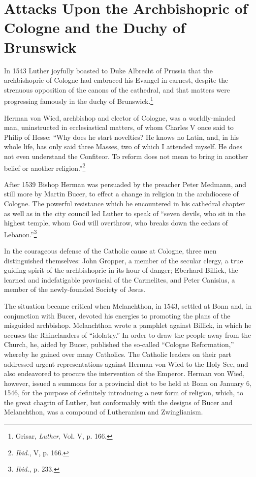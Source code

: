 \section{Attacks Upon the Archbishopric of Cologne and the Duchy of Brunswick}

In 1543 Luther joyfully boasted to Duke Albrecht of Prussia that
the archbishopric of Cologne had embraced his Evangel in earnest,
despite the strenuous opposition of the canons of the cathedral, and
that matters were progressing famously in the duchy of Brunswick.\footnote{Grisar, \textit{Luther}, Vol. V, p. 166.}

Herman von Wied, archbishop and elector of Cologne, was a
worldly-minded man, uninstructed in ecclesiastical matters, of whom
Charles V once said to Philip of Hesse: “Why does he start novelties?
He knows no Latin, and, in his whole life, has only said three Masses,
two of which I attended myself. He does not even understand the
Confiteor. To reform does not mean to bring in another belief or
another religion.”\footnote{\textit{Ibid.}, V, p. 166.}

After 1539 Bishop Herman was persuaded by the preacher Peter
Medmann, and still more by Martin Bucer, to effect a change in religion
in the archdiocese of Cologne. The powerful resistance which
he encountered in his cathedral chapter as well as in the city council
led Luther to speak of “seven devils, who sit in the highest temple,
whom God will overthrow, who breaks down the cedars of Lebanon.”\footnote{\textit{Ibid.}, p. 233.}

In the courageous defense of the Catholic cause at Cologne,
three men distinguished themselves: John Gropper, a member of the
secular clergy, a true guiding spirit of the archbishopric in its hour
of danger; Eberhard Billick, the lcarned and indefatigable provincial
of the Carmelites, and Peter Canisius, a member of the newly-founded
Society of Jesus.

The situation became critical when Melanchthon, in 1543, settled
at Bonn and, in conjunction with Bucer, devoted his energies to promoting
the plans of the misguided archbishop. Melanchthon wrote a
pamphlet against Billick, in which he accuses the Rhinelanders of
“idolatry.” In order to draw the people away from the Church, he,
aided by Bucer, published the so-called “Cologne Reformation,”
whereby he gained over many Catholics. The Catholic leaders on
their part addressed urgent representations against Herman von
Wied to the Holy See, and also endeavored to procure the intervention
of the Emperor. Herman von Wied, however, issued a summons for a provincial
diet to be held at Bonn on January 6, 1546,
for the purpose of definitely introducing a new form of religion,
which, to the great chagrin of Luther, but conformably with the
designs of Bucer and Melanchthon, was a compound of Lutheranism
and Zwinglianism.

